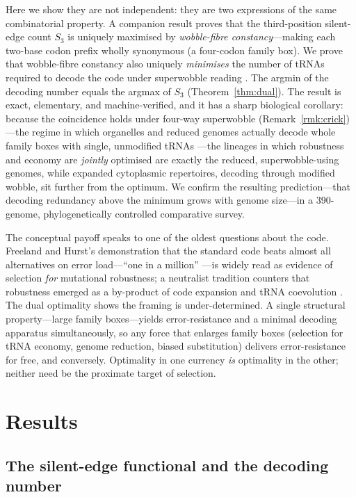 \documentclass[11pt]{article}
\theoremstyle{remark}
\newcommand{\Sthree}{S_3}
\begin{document}
Here we show they are not independent: they are two expressions of the same
combinatorial property. A companion result \cite{wobble} proves that the
third-position silent-edge count $\Sthree$ is uniquely maximised by
\emph{wobble-fibre constancy}---making each two-base codon prefix wholly
synonymous (a four-codon family box). We prove that wobble-fibre constancy also
uniquely \emph{minimises} the number of tRNAs required to decode the code under
superwobble reading \cite{rogalski}. The argmin of the decoding number equals the
argmax of $\Sthree$ (Theorem~\ref{thm:dual}). The result is exact, elementary, and
machine-verified, and it has a sharp biological corollary: because the
coincidence holds under four-way superwobble (Remark~\ref{rmk:crick})---the
regime in which organelles and reduced genomes actually decode whole family boxes
with single, unmodified tRNAs \cite{rogalski}---the lineages in which robustness
and economy are \emph{jointly} optimised are exactly the reduced,
superwobble-using genomes, while expanded cytoplasmic repertoires, decoding
through modified wobble, sit further from the optimum. We confirm the resulting
prediction---that decoding redundancy above the minimum grows with genome
size---in a 390-genome, phylogenetically controlled comparative survey.

The conceptual payoff speaks to one of the oldest questions about the code.
Freeland and Hurst's demonstration that the standard code beats almost all
alternatives on error load---``one in a million'' \cite{freeland,haig}---is
widely read as evidence of selection \emph{for} mutational robustness; a
neutralist tradition counters that robustness emerged as a by-product of code
expansion and tRNA coevolution \cite{massey,koonin}. The dual optimality shows
the framing is under-determined. A single structural property---large family
boxes---yields error-resistance and a minimal decoding apparatus simultaneously,
so any force that enlarges family boxes (selection for tRNA economy, genome
reduction, biased substitution) delivers error-resistance for free, and
conversely. Optimality in one currency \emph{is} optimality in the other; neither
need be the proximate target of selection.

\section{Results}

\subsection{The silent-edge functional and the decoding number}
\end{document}
